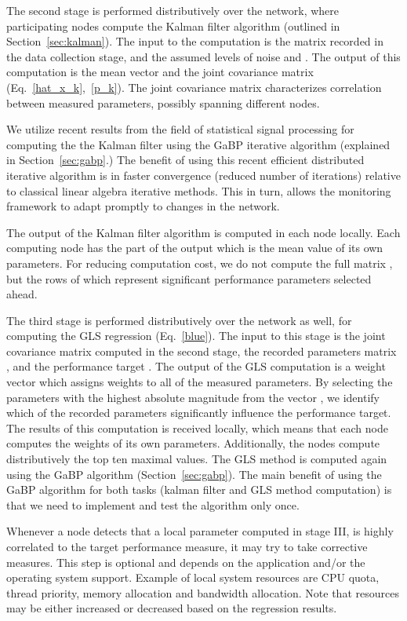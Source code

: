 \documentclass[times, 10pt,twocolumn]{article}
\begin{document}
The second stage is performed distributively over the network, where participating nodes compute the Kalman filter
algorithm (outlined in Section~\ref{sec:kalman}). The input to the computation is the matrix  recorded in the data collection stage, and the assumed levels of noise  and . The output of this computation is the mean vector  and the joint covariance matrix  (Eq.~\ref{hat_x_k},~\ref{p_k}). The joint covariance matrix characterizes correlation between measured parameters, possibly spanning different nodes.

We utilize recent results from the field of statistical signal processing for computing the the Kalman filter
using the GaBP iterative algorithm (explained in Section~\ref{sec:gabp}.) The benefit of using this recent efficient distributed iterative algorithm is in faster convergence (reduced number of iterations) relative to classical
linear algebra iterative methods. This in turn, allows the monitoring framework to adapt promptly to changes in the network.

The output of the Kalman filter algorithm   is computed in each node locally. Each computing node has the part of the output which is the mean
value of its own parameters. For reducing computation cost, we do not compute the full matrix , but the rows of  which represent significant performance parameters selected ahead. 

The third stage is performed distributively over the network as well, for computing the GLS regression (Eq.~\ref{blue}). The input to this stage is the joint covariance matrix  computed in the second stage, the
recorded parameters matrix , and the performance target . The output of the GLS computation is a weight
vector  which assigns weights to all of the measured parameters. By selecting the parameters
with the highest absolute magnitude from the vector , we identify which of the recorded parameters
significantly influence the performance target. The results of this computation is received locally, which means
that each node computes the weights of its own parameters. Additionally, the nodes compute distributively
the top ten maximal values. The GLS method is computed again using the GaBP algorithm (Section~\ref{sec:gabp}).
The main benefit of using the GaBP algorithm for both tasks (kalman filter and GLS method computation) is that we need to implement and test the algorithm only once.

\label{prediction}
Whenever a node detects that a local parameter computed in stage III, is highly correlated to the target
performance measure, it may try to take corrective measures. This step is optional and depends on the application and/or the operating system
support. Example of local system resources are CPU quota, thread priority, memory
allocation and bandwidth allocation. Note that resources may be either increased or decreased based on the regression results.
\end{document}
